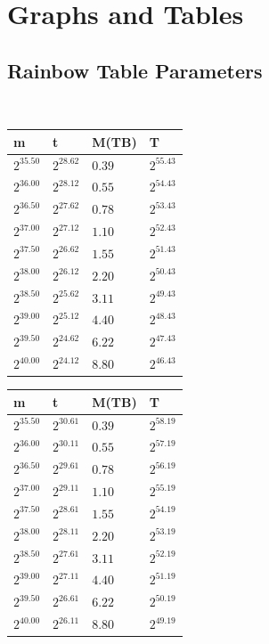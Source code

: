 \chapter{Graphs and Tables}
\section{Rainbow Table Parameters}
\label{sec:rainbowtab}
\begin{table}[h!]\centering
 \ 
\begin{tabular}{llll}
m & t & M(TB) & T \\ \hline
$2^{35.50}$ & $2^{28.62}$ & $0.39$ & $2^{55.43}$ \\
$2^{36.00}$ & $2^{28.12}$ & $0.55$ & $2^{54.43}$ \\
$2^{36.50}$ & $2^{27.62}$ & $0.78$ & $2^{53.43}$ \\
$2^{37.00}$ & $2^{27.12}$ & $1.10$ & $2^{52.43}$ \\
$2^{37.50}$ & $2^{26.62}$ & $1.55$ & $2^{51.43}$ \\
$2^{38.00}$ & $2^{26.12}$ & $2.20$ & $2^{50.43}$ \\
$2^{38.50}$ & $2^{25.62}$ & $3.11$ & $2^{49.43}$ \\
$2^{39.00}$ & $2^{25.12}$ & $4.40$ & $2^{48.43}$ \\
$2^{39.50}$ & $2^{24.62}$ & $6.22$ & $2^{47.43}$ \\
$2^{40.00}$ & $2^{24.12}$ & $8.80$ & $2^{46.43}$ \\
\end{tabular}
\end{table}


\begin{table}[h!]\centering
  \begin{tabular}{llll}
    m & t & M(TB) & T \\ \hline
    $2^{35.50}$ & $2^{30.61}$ & $0.39$ & $2^{58.19}$ \\
    $2^{36.00}$ & $2^{30.11}$ & $0.55$ & $2^{57.19}$ \\
    $2^{36.50}$ & $2^{29.61}$ & $0.78$ & $2^{56.19}$ \\
    $2^{37.00}$ & $2^{29.11}$ & $1.10$ & $2^{55.19}$ \\
    $2^{37.50}$ & $2^{28.61}$ & $1.55$ & $2^{54.19}$ \\
    $2^{38.00}$ & $2^{28.11}$ & $2.20$ & $2^{53.19}$ \\
    $2^{38.50}$ & $2^{27.61}$ & $3.11$ & $2^{52.19}$ \\
    $2^{39.00}$ & $2^{27.11}$ & $4.40$ & $2^{51.19}$ \\
    $2^{39.50}$ & $2^{26.61}$ & $6.22$ & $2^{50.19}$ \\
    $2^{40.00}$ & $2^{26.11}$ & $8.80$ & $2^{49.19}$ \\
  \end{tabular}
\end{table}


